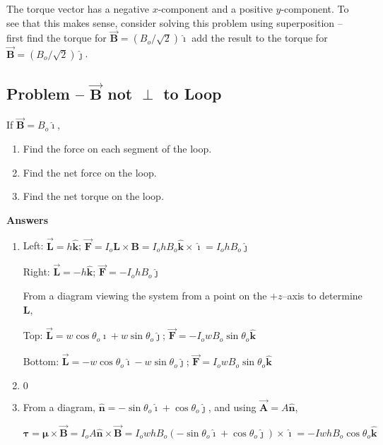 \documentclass{article}
\newcommand{\ihat}[0]{\hat{\boldsymbol{\imath}}}
\newcommand{\jhat}[0]{\hat{\boldsymbol{\jmath}}}
\newcommand{\khat}[0]{\hat{\boldsymbol{k}}}
\newcommand{\bfvec}[1]{\vec{\mathbf{#1}}}
\begin{document}
\begin{enumerate}
        The torque vector has a negative $x$-component and a positive $y$-component. To see that this makes sense, consider solving this problem using superposition -- first find the torque for $\bfvec{B}=(B_o/\sqrt{2})\ihat$ add the result to the torque for $\bfvec{B}=(B_o/\sqrt{2})\jhat$.
        \else
        \vskip 56.25pt
        \fi
        \ifsolutions\else
        \vskip 56.25pt
        \fi

\end{enumerate}

\subsection{Problem -- $\bfvec{B}$ not $\perp$ to Loop}



If $\bfvec{B}=B_o\ihat$,

\begin{enumerate}

  \item Find the force on each segment of the loop.

  \item Find the net force on the loop.

  \item Find the net torque on the loop.

\end{enumerate}

\ifsolutions
\textbf{Answers}

    \begin{enumerate}

      \item Left: $\bfvec{L} = h\khat$; $\bfvec{F}=I_o\mathbf{L}\times\mathbf{B}=I_ohB_o\khat\times\ihat=I_ohB_o\jhat$

            Right: $\bfvec{L} = -h\khat$; $\bfvec{F}=-I_ohB_o\jhat$

            From a diagram viewing the system from a point on the $+z$--axis to determine $\mathbf{L}$,

            Top: $\bfvec{L}=w\cos\theta_o\ihat + w\sin\theta_o\jhat$; $\bfvec{F}=-I_owB_o\sin\theta_o\khat$

            Bottom: $\bfvec{L}=-w\cos\theta_o\ihat - w\sin\theta_o\jhat$; $\bfvec{F}=I_owB_o\sin\theta_o\khat$

      \item $0$

      \item From a diagram, $\hat{\mathbf{n}}=-\sin\theta_o\ihat + \cos\theta_o\jhat$, and using $\bfvec{A}=A\hat{\mathbf{n}}$,

            $\boldsymbol{\tau}=\boldsymbol{\mu}\times\bfvec{B}=I_oA\hat{\mathbf{n}}\times\bfvec{B} = I_owhB_o(-\sin\theta_o\ihat + \cos\theta_o\jhat)\times\ihat=-IwhB_o\cos\theta_o\khat$

    \end{enumerate}
\else

\fi
\ifsolutions\else

\fi
\end{document}
